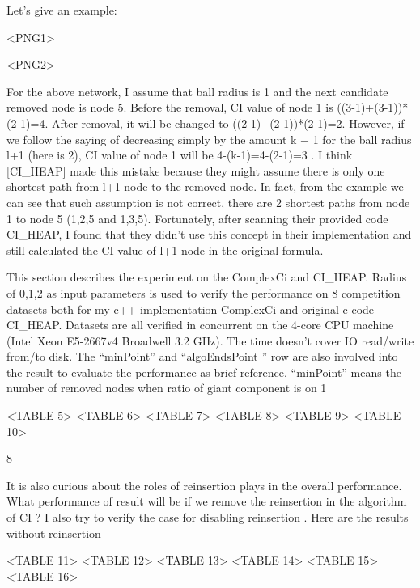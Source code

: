 \documentclass{article}
\begin{document}
	Let’s give an example:


	<PNG1>
	
	<PNG2>
	
	
	For the above network, I assume that ball radius is 1 and the next candidate removed node is node 5. Before the removal, CI value of node 1 is ((3-1)+(3-1))*(2-1)=4. After removal, it will be changed to ((2-1)+(2-1))*(2-1)=2. However, if we follow the saying of decreasing simply by the amount k − 1 for the ball radius l+1 (here is 2), CI value of node 1 will be 4-(k-1)=4-(2-1)=3 . I think [CI\_HEAP] made this mistake because they might assume there is only one shortest path from l+1 node to the removed node. In fact, from the example we can see that such assumption is not correct, there are 2 shortest paths from node 1 to node 5 (1,2,5 and 1,3,5). Fortunately, after scanning their provided code CI\_HEAP, I found that they didn’t use this concept in their implementation and still calculated the CI value of l+1 node in the original formula.
	
	This section describes the experiment on the ComplexCi and CI\_HEAP. Radius of 0,1,2 as input parameters is used to verify the performance on 8 competition datasets both for my c++ implementation ComplexCi and original c code CI\_HEAP. Datasets are all verified in concurrent on the 4-core CPU machine (Intel Xeon E5-2667v4 Broadwell 3.2 GHz). The time doesn't cover IO read/write from/to disk. The “minPoint” and “algoEndsPoint ” row are also involved into the result to evaluate the performance as brief reference. “minPoint” means the number of removed nodes when ratio of giant component is on 1%
	
	<TABLE 5>
	<TABLE 6>
	<TABLE 7>
	<TABLE 8>
	<TABLE 9>
	<TABLE 10>
	
	8
	
	It is also curious about the roles of reinsertion plays in the overall performance. What performance of result will be if we remove the reinsertion in the algorithm of CI ? I also try to verify the case for disabling reinsertion . Here are the results without reinsertion 
	
	<TABLE 11>
	<TABLE 12>
	<TABLE 13>
	<TABLE 14>
	<TABLE 15>
	<TABLE 16>
	
\end{document}
